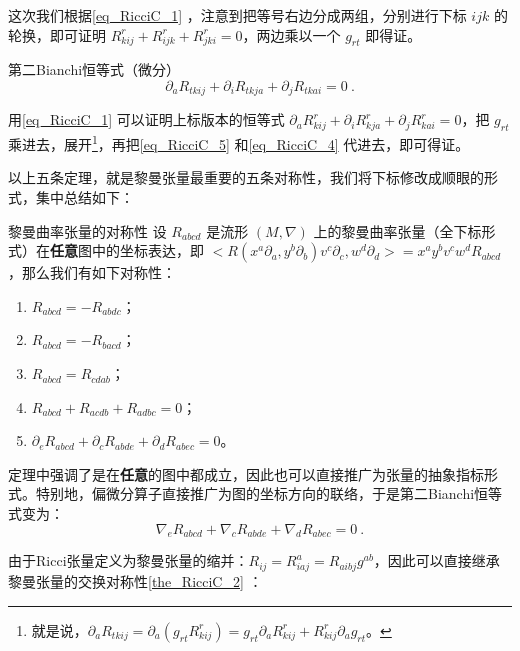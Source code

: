 这次我们根据\autoref{eq_RicciC_1} ，注意到把等号右边分成两组，分别进行下标 $ijk$ 的轮换，即可证明 $R^r_{kij}+R^r_{ijk}+R^r_{jki}=0$，两边乘以一个 $g_{rt}$ 即得证。

\begin{theorem}{第二Bianchi恒等式（微分）}
\begin{equation}\label{eq_RicciC_7}
\partial_aR_{tkij}+\partial_iR_{tkja}+\partial_jR_{tkai}=0~.
\end{equation}
\end{theorem}

用\autoref{eq_RicciC_1} 可以证明上标版本的恒等式 $\partial_aR_{kij}^r+\partial_iR_{kja}^r+\partial_jR_{kai}^r=0$，把 $g_{rt}$ 乘进去，展开\footnote{就是说，$\partial_aR_{tkij}=\partial_a(g_{rt}R^{r}_{kij})=g_{rt}\partial_aR^r_{kij}+R^r_{kij}\partial_ag_{rt}$。}，再把\autoref{eq_RicciC_5} 和\autoref{eq_RicciC_4} 代进去，即可得证。


以上五条定理，就是黎曼张量最重要的五条对称性，我们将下标修改成顺眼的形式，集中总结如下：



\begin{corollary}{黎曼曲率张量的对称性}
设 $R_{abcd}$ 是流形 $(M, \nabla)$ 上的黎曼曲率张量（全下标形式）在\textbf{任意}图中的坐标表达，即 $<R(x^a\partial_a, y^b\partial_b)v^c\partial_c, w^d\partial_d>=x^ay^bv^cw^dR_{abcd}$，那么我们有如下对称性：
\begin{enumerate}
\item $R_{abcd}=-R_{abdc}$；
\item $R_{abcd}=-R_{bacd}$；
\item $R_{abcd}=R_{cdab}$；
\item $R_{abcd}+R_{acdb}+R_{adbc}=0$；
\item $\partial_eR_{abcd}+\partial_cR_{abde}+\partial_dR_{abec}=0$。
\end{enumerate}
\end{corollary}





定理中强调了是在\textbf{任意}的图中都成立，因此也可以直接推广为张量的抽象指标形式。特别地，偏微分算子直接推广为图的坐标方向的联络，于是第二Bianchi恒等式变为：
\begin{equation}\label{eq_RicciC_8}
\nabla_eR_{abcd}+\nabla_cR_{abde}+\nabla_dR_{abec}=0~.
\end{equation}

由于Ricci张量定义为黎曼张量的缩并：$R_{ij}=R^a_{iaj}=R_{aibj}g^{ab}$，因此可以直接继承黎曼张量的交换对称性\autoref{the_RicciC_2} ：

